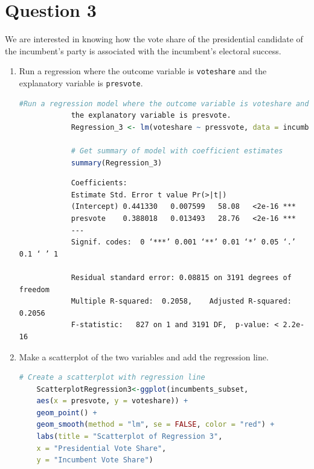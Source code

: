 \documentclass[12pt,letterpaper]{article}
\begin{document}
	\newpage	
\section*{Question 3}

\noindent We are interested in knowing how the vote share of the presidential candidate of the incumbent's party is associated with the incumbent's electoral success.
	\vspace{.25cm}
	\begin{enumerate}
		\item Run a regression where the outcome variable is \texttt{voteshare} and the explanatory variable is \texttt{presvote}.
			\vspace{0cm}
			
			\begin{lstlisting}[language=R, caption={Regression Model 3 in R}, label={lst:regression_model}]
			#Run a regression model where the outcome variable is voteshare and 
			the explanatory variable is presvote.
			Regression_3 <- lm(voteshare ~ pressvote, data = incumbents_subset)
				
			# Get summary of model with coefficient estimates
			summary(Regression_3)
			\end{lstlisting}
			
			\begin{verbatim}
			Coefficients:
			Estimate Std. Error t value Pr(>|t|)    
			(Intercept) 0.441330   0.007599   58.08   <2e-16 ***
			presvote    0.388018   0.013493   28.76   <2e-16 ***
			---
			Signif. codes:  0 ‘***’ 0.001 ‘**’ 0.01 ‘*’ 0.05 ‘.’ 0.1 ‘ ’ 1
			
			Residual standard error: 0.08815 on 3191 degrees of freedom
			Multiple R-squared:  0.2058,	Adjusted R-squared:  0.2056 
			F-statistic:   827 on 1 and 3191 DF,  p-value: < 2.2e-16
		\end{verbatim}
			
		\item Make a scatterplot of the two variables and add the regression line. 
			\vspace{1cm}
			
	\begin{lstlisting}[language=R, caption={Scatterplot 3 code in R}, label={lst:regression_model}]
	# Create a scatterplot with regression line
	ScatterplotRegression3<-ggplot(incumbents_subset, 
	aes(x = presvote, y = voteshare)) +
	geom_point() +
	geom_smooth(method = "lm", se = FALSE, color = "red") +
	labs(title = "Scatterplot of Regression 3",
	x = "Presidential Vote Share",
	y = "Incumbent Vote Share")
	

\end{lstlisting}
\end{enumerate}
\end{document}
